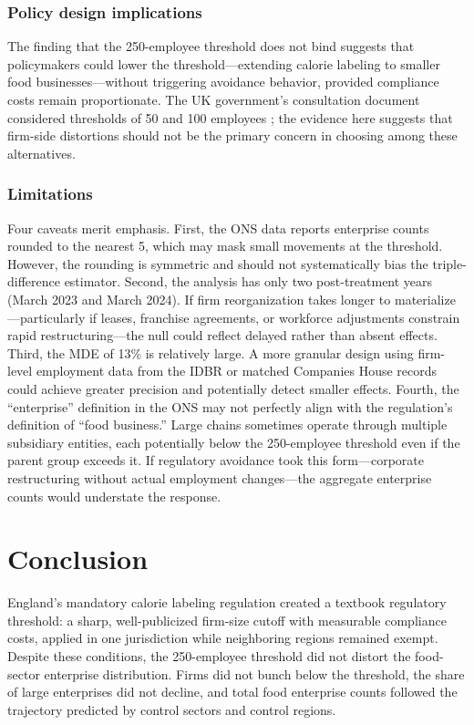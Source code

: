 \documentclass[12pt]{article}
\begin{document}
\subsubsection*{Policy design implications} The finding that the 250-employee threshold does not bind suggests that policymakers could lower the threshold---extending calorie labeling to smaller food businesses---without triggering avoidance behavior, provided compliance costs remain proportionate. The UK government's consultation document considered thresholds of 50 and 100 employees \citep{dhsc2021impact}; the evidence here suggests that firm-side distortions should not be the primary concern in choosing among these alternatives.

\subsubsection*{Limitations} Four caveats merit emphasis. First, the ONS data reports enterprise counts rounded to the nearest 5, which may mask small movements at the threshold. However, the rounding is symmetric and should not systematically bias the triple-difference estimator. Second, the analysis has only two post-treatment years (March 2023 and March 2024). If firm reorganization takes longer to materialize---particularly if leases, franchise agreements, or workforce adjustments constrain rapid restructuring---the null could reflect delayed rather than absent effects. Third, the MDE of 13\% is relatively large. A more granular design using firm-level employment data from the IDBR or matched Companies House records could achieve greater precision and potentially detect smaller effects. Fourth, the ``enterprise'' definition in the ONS may not perfectly align with the regulation's definition of ``food business.'' Large chains sometimes operate through multiple subsidiary entities, each potentially below the 250-employee threshold even if the parent group exceeds it. If regulatory avoidance took this form---corporate restructuring without actual employment changes---the aggregate enterprise counts would understate the response.

\section{Conclusion}

England's mandatory calorie labeling regulation created a textbook regulatory threshold: a sharp, well-publicized firm-size cutoff with measurable compliance costs, applied in one jurisdiction while neighboring regions remained exempt. Despite these conditions, the 250-employee threshold did not distort the food-sector enterprise distribution. Firms did not bunch below the threshold, the share of large enterprises did not decline, and total food enterprise counts followed the trajectory predicted by control sectors and control regions.
\end{document}
